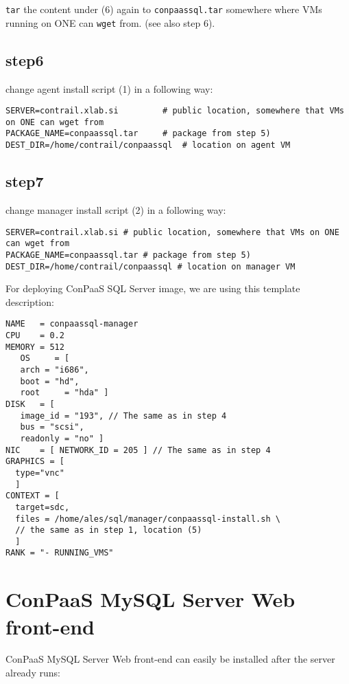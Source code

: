 \documentclass[a4paper,10pt]{article}
\begin{document}
{\tt tar} the content under (6) again to {\tt conpaassql.tar} somewhere where VMs running on ONE can {\tt wget} from. (see also step 6). 

\subsection*{step6}

change agent install script (1) in a following way:

\begin{Verbatim}[frame=single]
SERVER=contrail.xlab.si			# public location, somewhere that VMs on ONE can wget from
PACKAGE_NAME=conpaassql.tar		# package from step 5)
DEST_DIR=/home/contrail/conpaassql	# location on agent VM
\end{Verbatim}

\subsection*{step7}

change manager install script (2) in a following way:

\begin{Verbatim}[frame=single]
SERVER=contrail.xlab.si # public location, somewhere that VMs on ONE can wget from
PACKAGE_NAME=conpaassql.tar # package from step 5)
DEST_DIR=/home/contrail/conpaassql # location on manager VM
\end{Verbatim}

For deploying ConPaaS SQL Server image, we are using this template description:

\begin{Verbatim}[frame=single]
NAME   = conpaassql-manager
CPU    = 0.2
MEMORY = 512
   OS     = [
   arch = "i686",
   boot = "hd",
   root     = "hda" ]
DISK   = [
   image_id = "193", // The same as in step 4
   bus = "scsi",
   readonly = "no" ]
NIC    = [ NETWORK_ID = 205 ] // The same as in step 4
GRAPHICS = [
  type="vnc"
  ]
CONTEXT = [
  target=sdc,
  files = /home/ales/sql/manager/conpaassql-install.sh \
  // the same as in step 1, location (5)
  ]
RANK = "- RUNNING_VMS"
\end{Verbatim}

\section{ConPaaS MySQL Server Web front-end}
\label{sec:web-front-end}
ConPaaS MySQL Server Web front-end can easily be installed after the server already runs: 
\end{document}
